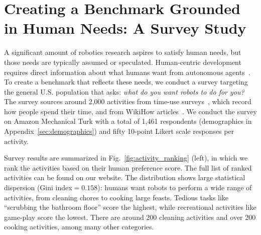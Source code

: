 \section{Creating a Benchmark Grounded in Human Needs: A Survey Study}
\label{sec:survey}



A significant amount of robotics research aspires to satisfy human needs, but those needs are typically assumed or speculated. Human-centric development requires direct information about what humans want from autonomous agents~\cite{littman2021gathering}. To create a benchmark that reflects these needs, we conduct a survey targeting the general U.S. population that asks: \textit{what do you want robots to do for you?} The survey sources around 2,000 activities from time-use surveys~\cite{atus, hetus, mtus}, which record how people spend their time, and from WikiHow articles~\cite{wikihow}. We conduct the survey on Amazon Mechanical Turk with a total of 1,461 respondents (demographics in Appendix~\ref{sec:demographics}) and fifty 10-point Likert scale responses per activity.

Survey results are summarized in Fig.~\ref{fig:activity_ranking} (left), in which we rank the activities based on their human preference score. The full list of ranked activities can be found on our website. The distribution shows large statistical dispersion (Gini index$=0.158$): humans want robots to perform a wide range of activities, from cleaning chores to cooking large feasts. Tedious tasks like ``scrubbing the bathroom floor'' score the highest, while recreational activities like game-play score the lowest. There are around 200 cleaning activities and over 200 cooking activities, among many other categories.

